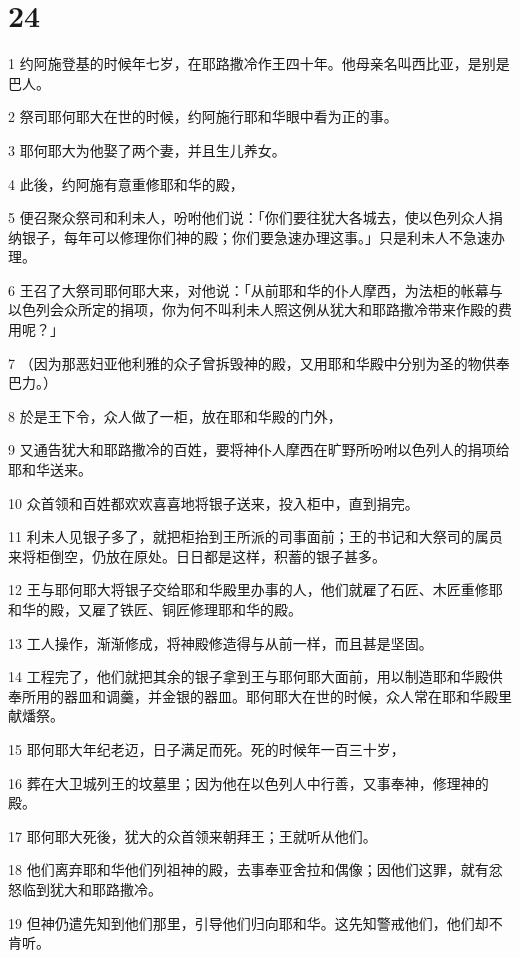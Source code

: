 \chapter{24}

\par 1 约阿施登基的时候年七岁，在耶路撒冷作王四十年。他母亲名叫西比亚，是别是巴人。
\par 2 祭司耶何耶大在世的时候，约阿施行耶和华眼中看为正的事。
\par 3 耶何耶大为他娶了两个妻，并且生儿养女。
\par 4 此後，约阿施有意重修耶和华的殿，
\par 5 便召聚众祭司和利未人，吩咐他们说：「你们要往犹大各城去，使以色列众人捐纳银子，每年可以修理你们神的殿；你们要急速办理这事。」只是利未人不急速办理。
\par 6 王召了大祭司耶何耶大来，对他说：「从前耶和华的仆人摩西，为法柜的帐幕与以色列会众所定的捐项，你为何不叫利未人照这例从犹大和耶路撒冷带来作殿的费用呢？」
\par 7 （因为那恶妇亚他利雅的众子曾拆毁神的殿，又用耶和华殿中分别为圣的物供奉巴力。）
\par 8 於是王下令，众人做了一柜，放在耶和华殿的门外，
\par 9 又通告犹大和耶路撒冷的百姓，要将神仆人摩西在旷野所吩咐以色列人的捐项给耶和华送来。
\par 10 众首领和百姓都欢欢喜喜地将银子送来，投入柜中，直到捐完。
\par 11 利未人见银子多了，就把柜抬到王所派的司事面前；王的书记和大祭司的属员来将柜倒空，仍放在原处。日日都是这样，积蓄的银子甚多。
\par 12 王与耶何耶大将银子交给耶和华殿里办事的人，他们就雇了石匠、木匠重修耶和华的殿，又雇了铁匠、铜匠修理耶和华的殿。
\par 13 工人操作，渐渐修成，将神殿修造得与从前一样，而且甚是坚固。
\par 14 工程完了，他们就把其余的银子拿到王与耶何耶大面前，用以制造耶和华殿供奉所用的器皿和调羹，并金银的器皿。耶何耶大在世的时候，众人常在耶和华殿里献燔祭。
\par 15 耶何耶大年纪老迈，日子满足而死。死的时候年一百三十岁，
\par 16 葬在大卫城列王的坟墓里；因为他在以色列人中行善，又事奉神，修理神的殿。
\par 17 耶何耶大死後，犹大的众首领来朝拜王；王就听从他们。
\par 18 他们离弃耶和华他们列祖神的殿，去事奉亚舍拉和偶像；因他们这罪，就有忿怒临到犹大和耶路撒冷。
\par 19 但神仍遣先知到他们那里，引导他们归向耶和华。这先知警戒他们，他们却不肯听。
